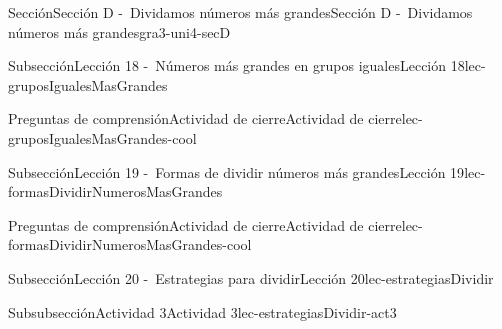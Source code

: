 \begin{sectionptx}{Sección}{Sección D -~Dividamos números más grandes}{}{Sección D -~Dividamos números más grandes}{}{}{gra3-uni4-secD}
%
%
\typeout{************************************************}
\typeout{************************************************}
%
\begin{subsectionptx}{Subsección}{Lección 18 -~Números más grandes en grupos iguales}{}{Lección 18}{}{}{lec-gruposIgualesMasGrandes}
%
%
\typeout{************************************************}
\typeout{************************************************}
%
\begin{reading-questions-subsubsection-numberless}{Preguntas de comprensión}{Actividad de cierre}{}{Actividad de cierre}{}{}{lec-gruposIgualesMasGrandes-cool}
%
\end{reading-questions-subsubsection-numberless}
\end{subsectionptx}
%
%
\typeout{************************************************}
\typeout{************************************************}
%
\begin{subsectionptx}{Subsección}{Lección 19 -~Formas de dividir números más grandes}{}{Lección 19}{}{}{lec-formasDividirNumerosMasGrandes}
%
%
\typeout{************************************************}
\typeout{************************************************}
%
\begin{reading-questions-subsubsection-numberless}{Preguntas de comprensión}{Actividad de cierre}{}{Actividad de cierre}{}{}{lec-formasDividirNumerosMasGrandes-cool}
%
\end{reading-questions-subsubsection-numberless}
\end{subsectionptx}
%
%
\typeout{************************************************}
\typeout{************************************************}
%
\begin{subsectionptx}{Subsección}{Lección 20 -~Estrategias para dividir}{}{Lección 20}{}{}{lec-estrategiasDividir}
%
%
\typeout{************************************************}
\typeout{************************************************}
%
\begin{cutoutpage}
\begin{subsubsectionptx}{Subsubsección}{Actividad 3}{}{Actividad 3}{}{}{lec-estrategiasDividir-act3}

\end{subsubsectionptx}
\end{cutoutpage}
\end{subsectionptx}
\end{sectionptx}
